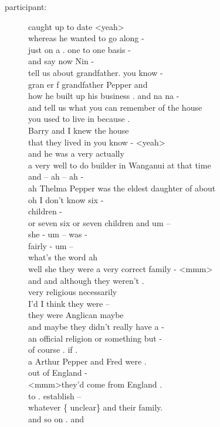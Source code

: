 \documentclass{article}
\newcommand{\turn}[2]{
\item[#1:] #2
}
\begin{document}
\begin{description}
\turn{participant}{caught up to date \textless yeah\textgreater \\
whereas he wanted to go along -\\
just on a . one to one basis -\\
and say now Nin -\\
tell us about grandfather. you know -\\
gran er f grandfather Pepper and\\
how he built up his business . and na na -\\
and tell us what you can remember of the house\\
you used to live in because .\\
Barry and I knew the house\\
that they lived in you know - \textless yeah\textgreater \\
and he was a very actually\\
a very well to do builder in Wanganui at that time\\
and -- ah -- ah -\\
ah Thelma Pepper was the eldest daughter of about\\
oh I don't know six -\\
children -\\
or seven six or seven children and um --\\
she - um -- was -\\
fairly - um --\\
what's the word ah\\
well she they were a very correct family - \textless mmm\textgreater \\
and and although they weren't .\\
very religious necessarily\\
I'd I think they were --\\
they were Anglican maybe\\
and maybe they didn't really have a -\\
an official religion or something but -\\
of course . if .\\
a Arthur Pepper and Fred were .\\
out of England -\\
\textless mmm\textgreater  they'd come from England .\\
to . establish --\\
whatever \{ unclear\}  and their family.\\
and so on . and\\
}
\end{description}
\end{document}
